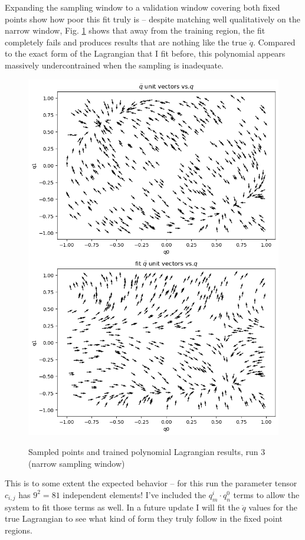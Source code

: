 \documentclass[]{article}
\begin{document}
Expanding the sampling window to a validation window covering both fixed points show how poor this fit truly is -- despite matching well qualitatively on the narrow window, Fig. \ref{fig:poly-fit-3-val} shows that away from the training region, the fit completely fails and produces results that are nothing like the true $\ddot{q}$. Compared to the exact form of the Lagrangian that I fit before, this polynomial appears massively undercontrained when the sampling is inadequate.

\begin{figure}[H]
	\caption{Sampled points and trained polynomial Lagrangian results, run 3 (narrow sampling window)}
	\centering
	\includegraphics[scale=0.60]{poly-fit-3-val.png}
	\label{fig:poly-fit-3-val}
\end{figure}

This is to some extent the expected behavior -- for this run the parameter tensor $c_{i,j}$ has $9^2=81$ independent elements! I've included the $q_m^i\cdot q_n^0$ terms to allow the system to fit those terms as well. In a future update I will fit the $\ddot{q}$ values for the true Lagrangian to see what kind of form they truly follow in the fixed point regions.
\end{document}
